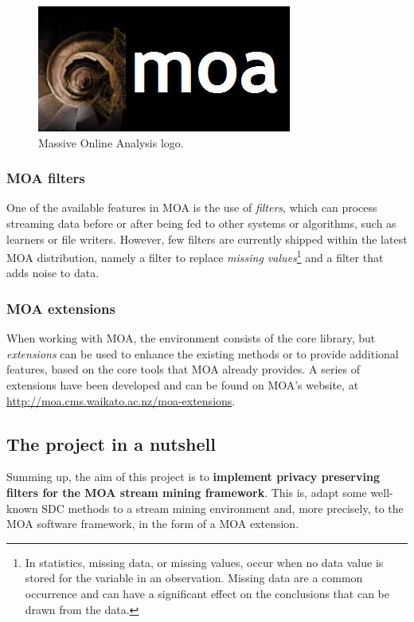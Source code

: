\begin{figure}[h]
	\centering
	\includegraphics[width=0.4\linewidth]{figures/moa-logo.jpg}
	\caption{Massive Online Analysis logo.}
	\label{fig:moa-logo}
\end{figure}

\subsubsection{MOA filters}

One of the available features in MOA is the use of \textit{filters}, which can process
streaming data before or after being fed to other systems or algorithms, such as learners
or file writers. However, few filters are currently shipped within the latest MOA distribution,
namely a filter to replace \textit{missing values}\footnote{In statistics, missing data, or missing values,
occur when no data value is stored for the variable in an observation. Missing data are a
common occurrence and can have a significant effect on the conclusions that can be drawn
from the data.} and a filter that adds noise to data.

\subsubsection{MOA extensions}

When working with MOA, the environment consists of the core library, but \textit{extensions}
can be used to enhance the existing methods or to provide additional features, based on
the core tools that MOA already provides. A series of extensions have been developed and can
be found on MOA's website, at \url{http://moa.cms.waikato.ac.nz/moa-extensions}.

\subsection{The project in a nutshell}
\label{Introduction::moa-ppsm::ProjectNutshell}

Summing up, the aim of this project is to \textbf{implement privacy preserving filters
for the MOA stream mining framework}. This is, adapt some well-known SDC methods to a stream mining environment and, more precisely, to the MOA software framework, in the form of a MOA extension.

